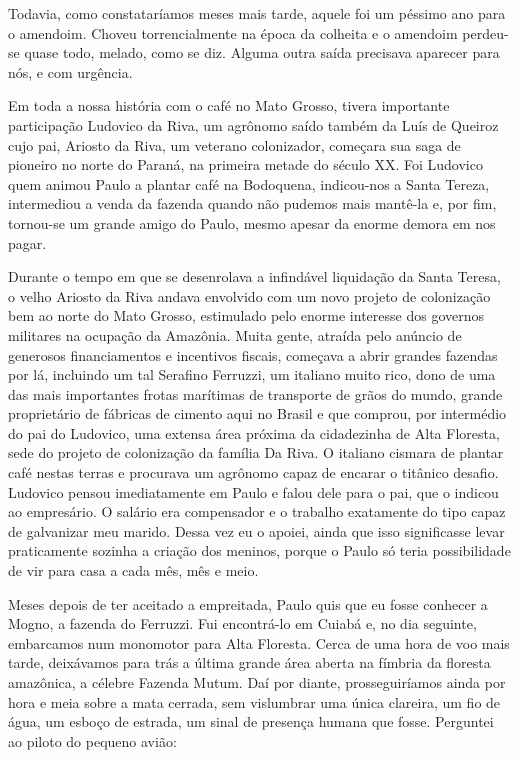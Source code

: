 Todavia, como constataríamos meses mais tarde, aquele foi um péssimo ano para o amendoim.
Choveu torrencialmente na época da colheita e o amendoim perdeu-se quase todo, melado, como se diz.
Alguma outra saída precisava aparecer para nós, e com urgência.

Em toda a nossa história com o café no Mato Grosso, tivera importante participação Ludovico da Riva, um agrônomo saído também da Luís de Queiroz cujo pai, Ariosto da Riva, um veterano colonizador, começara sua saga de pioneiro no norte do Paraná, na primeira metade do século XX.
Foi Ludovico quem animou Paulo a plantar café na Bodoquena, indicou-nos a Santa Tereza, intermediou a venda da fazenda quando não pudemos mais mantê-la e, por fim, tornou-se um grande amigo do Paulo, mesmo apesar da enorme demora em nos pagar.

Durante o tempo em que se desenrolava a infindável liquidação da Santa Teresa, o velho Ariosto da Riva andava envolvido com um novo projeto de colonização bem ao norte do Mato Grosso, estimulado pelo enorme interesse dos governos militares na ocupação da Amazônia.
Muita gente, atraída pelo anúncio de generosos financiamentos e incentivos fiscais, começava a abrir grandes fazendas por lá, incluindo um tal Serafino Ferruzzi, um italiano muito rico, dono de uma das mais importantes frotas marítimas de transporte de grãos do mundo, grande proprietário de fábricas de cimento aqui no Brasil e que comprou, por intermédio do pai do Ludovico, uma extensa área próxima da cidadezinha de Alta Floresta, sede do projeto de colonização da família Da Riva.
O italiano cismara de plantar café nestas terras e procurava um agrônomo capaz de encarar o titânico desafio.
Ludovico pensou imediatamente em Paulo e falou dele para o pai, que o indicou ao empresário.
O salário era compensador e o trabalho exatamente do tipo capaz de galvanizar meu marido.
Dessa vez eu o apoiei, ainda que isso significasse levar praticamente sozinha a criação dos meninos, porque o Paulo só teria possibilidade de vir para casa a cada mês, mês e meio.

Meses depois de ter aceitado a empreitada, Paulo quis que eu fosse conhecer a Mogno, a fazenda do Ferruzzi.
Fui encontrá-lo em Cuiabá e, no dia seguinte, embarcamos num monomotor para Alta Floresta.
Cerca de uma hora de voo mais tarde, deixávamos para trás a última grande área aberta na fímbria da floresta amazônica, a célebre Fazenda Mutum.
Daí por diante, prosseguiríamos ainda por hora e meia sobre a mata cerrada, sem vislumbrar uma única clareira, um fio de água, um esboço de estrada, um sinal de presença humana que fosse.
Perguntei ao piloto do pequeno avião:

